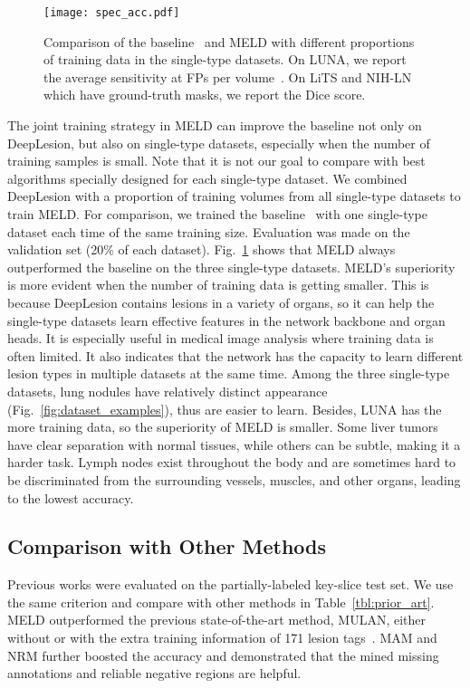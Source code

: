 \documentclass[runningheads]{llncs}
\def\Fig#1{{Fig.~\ref{fig:#1}}}
\def\Table#1{{Table~\ref{tbl:#1}}}
\begin{document}
\begin{figure}[t]
	\centering
	\texttt{[image: spec\_acc.pdf]} \caption{Comparison of the baseline~\cite{Yan2019MULAN} and MELD with different proportions of training data in the single-type datasets. On LUNA, we report the average sensitivity at  FPs per volume~\cite{Setio2017LUNA}. On LiTS and NIH-LN which have ground-truth masks, we report the Dice score.}
	\label{fig:spec_acc} \vspace{-5mm}
\end{figure}

The joint training strategy in MELD can improve the baseline not only on DeepLesion, but also on single-type datasets, especially when the number of training samples is small. Note that it is not our goal to compare with best algorithms specially designed for each single-type dataset. We combined DeepLesion with a proportion of training volumes from all single-type datasets to train MELD. For comparison, we trained the baseline~\cite{Yan2019MULAN} with one single-type dataset each time of the same training size. Evaluation was made on the validation set (20\% of each dataset). \Fig{spec_acc} shows that MELD always outperformed the baseline on the three single-type datasets. MELD's superiority is more evident when the number of training data is getting smaller. This is because DeepLesion contains lesions in a variety of organs, so it can help the single-type datasets learn effective features in the network backbone and organ heads. It is especially useful in medical image analysis where training data is often limited. It also indicates that the network has the capacity to learn different lesion types in multiple datasets at the same time. Among the three single-type datasets, lung nodules have relatively distinct appearance (\Fig{dataset_examples}), thus are easier to learn. Besides, LUNA has the more training data, so the superiority of MELD is smaller. Some liver tumors have clear separation with normal tissues, while others can be subtle, making it a harder task. Lymph nodes exist throughout the body and are sometimes hard to be discriminated from the surrounding vessels, muscles, and other organs, leading to the lowest accuracy.


\subsection{Comparison with Other Methods}
\label{subsec:comparison}

Previous works were evaluated on the partially-labeled key-slice test set. We use the same criterion and compare with other methods in \Table{prior_art}. MELD outperformed the previous state-of-the-art method, MULAN, either without or with the extra training information of 171 lesion tags~\cite{Yan2019MULAN}. MAM and NRM further boosted the accuracy and demonstrated that the mined missing annotations and reliable negative regions are helpful.
\end{document}
